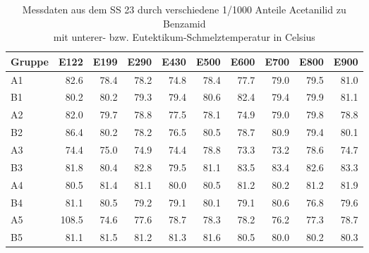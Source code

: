 \begin{table}[h]
\centering \begin{tabular}{lrrrrrrrrr}
\toprule
Gruppe & E122 & E199 & E290 & E430 & E500 & E600 & E700 & E800 & E900 \\
\midrule
A1 & 82.6 & 78.4 & 78.2 & 74.8 & 78.4 & 77.7 & 79.0 & 79.5 & 81.0 \\
B1 & 80.2 & 80.2 & 79.3 & 79.4 & 80.6 & 82.4 & 79.4 & 79.9 & 81.1 \\
A2 & 82.0 & 79.7 & 78.8 & 77.5 & 78.1 & 74.9 & 79.0 & 79.8 & 78.8 \\
B2 & 86.4 & 80.2 & 78.2 & 76.5 & 80.5 & 78.7 & 80.9 & 79.4 & 80.1 \\
A3 & 74.4 & 75.0 & 74.9 & 74.4 & 78.8 & 73.3 & 73.2 & 78.6 & 74.7 \\
B3 & 81.8 & 80.4 & 82.8 & 79.5 & 81.1 & 83.5 & 83.4 & 82.6 & 83.3 \\
A4 & 80.5 & 81.4 & 81.1 & 80.0 & 80.5 & 81.2 & 80.2 & 81.2 & 81.9 \\
B4 & 81.1 & 80.5 & 79.2 & 79.1 & 80.1 & 79.1 & 80.6 & 76.8 & 79.6 \\
A5 & 108.5 & 74.6 & 77.6 & 78.7 & 78.3 & 78.2 & 76.2 & 77.3 & 78.7 \\
B5 & 81.1 & 81.5 & 81.2 & 81.3 & 81.6 & 80.5 & 80.0 & 80.2 & 80.3 \\
\bottomrule
\end{tabular}
\caption{Messdaten aus dem SS 23 durch verschiedene 1/1000 Anteile Acetanilid zu Benzamid\\mit unterer- bzw. Eutektikum-Schmelztemperatur in Celsius}
\end{table}
